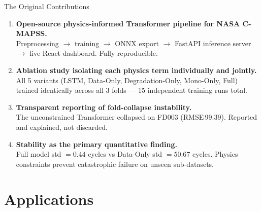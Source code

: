 \documentclass[10pt, aspectratio=169, handout]{beamer}
\begin{document}
\begin{frame}{The Original Contributions}
  \small
  \begin{enumerate}
    \setlength\itemsep{8pt}
    \item<1-> \textbf{Open-source physics-informed Transformer pipeline for NASA C-MAPSS.}\\
          {\footnotesize Preprocessing $\to$ training $\to$ ONNX export $\to$ FastAPI inference server
          $\to$ live React dashboard. Fully reproducible.}

    \item<2-> \textbf{Ablation study isolating each physics term individually and jointly.}\\
          {\footnotesize All 5 variants (LSTM, Data-Only, Degradation-Only, Mono-Only, Full)
          trained identically across all 3 folds --- 15 independent training runs total.}

    \item<3-> \textbf{Transparent reporting of fold-collapse instability.}\\
          {\footnotesize The unconstrained Transformer collapsed on FD003 (RMSE\,99.39).
          Reported and explained, not discarded.}

    \item<4-> \textbf{Stability as the primary quantitative finding.}\\
          {\footnotesize Full model std $= 0.44$ cycles vs Data-Only std $= 50.67$ cycles.
          Physics constraints prevent catastrophic failure on unseen sub-datasets.}
  \end{enumerate}
\end{frame}

\section{Applications}
\end{document}
